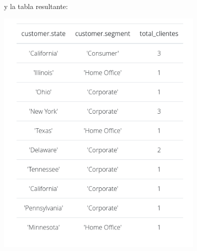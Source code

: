 y la tabla resultante: \\

\begin{center}
    \includegraphics[width=10cm]{resources/pregunta2/2.5.3.png} \\
\end{center}
